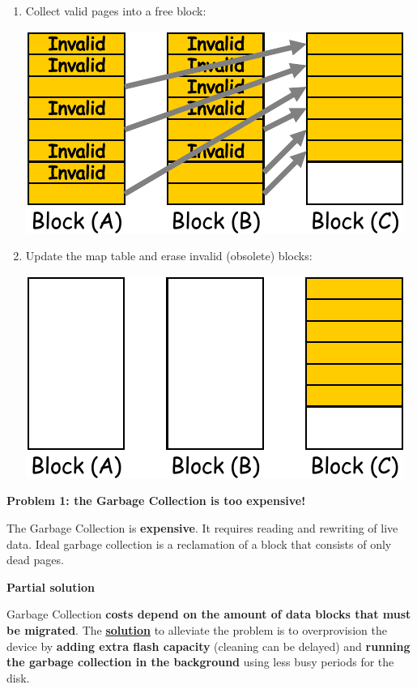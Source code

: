 \begin{examplebox}
\begin{enumerate}
        \item Collect valid pages into a free block:
        \begin{center}
            \includegraphics[width=.5\textwidth]{img/garbage-collection-4.pdf}
        \end{center}

        \item Update the map table and erase invalid (obsolete) blocks:
        \begin{center}
            \includegraphics[width=.5\textwidth]{img/garbage-collection-5.pdf}
        \end{center}
    \end{enumerate}
\end{examplebox}

\begin{flushleft}
    \textcolor{Red2}{ \textbf{Problem 1: the Garbage Collection is too expensive!}}
\end{flushleft}
The Garbage Collection is \textbf{expensive}. It requires reading and rewriting of live data. Ideal garbage collection is a reclamation of a block that consists of only dead pages.

\highspace
\begin{flushleft}
    \textcolor{Green3}{ \textbf{Partial solution}}
\end{flushleft}
Garbage Collection \textbf{costs depend on the amount of data blocks that must be migrated}. The \underline{\textbf{solution}} to alleviate the problem is to overprovision the device by \textbf{adding extra flash capacity} (cleaning can be delayed) and \textbf{running the garbage collection in the background} using less busy periods for the disk.

